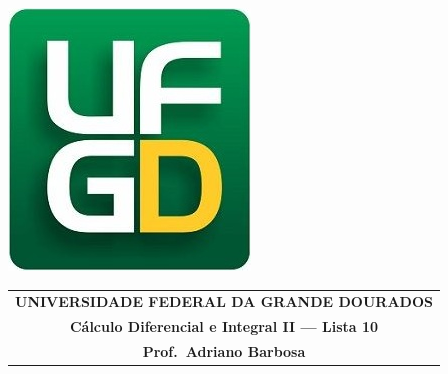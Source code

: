\documentclass[a4paper,5pt]{amsbook}
\begin{document}
\thispagestyle{empty}
\pagestyle{empty}
\begin{minipage}[h]{0.14\textwidth}
    \includegraphics[scale=0.24]{../../ufgd.png}
\end{minipage}
\begin{minipage}[h]{\textwidth}
    \begin{tabular}{c}
        {{\bf UNIVERSIDADE FEDERAL DA GRANDE DOURADOS}}\\
        {{\bf C\'{a}lculo Diferencial e Integral II --- Lista 10}}\\
        {{\bf Prof.\ Adriano Barbosa}}\\
    \end{tabular}
    \vspace{-0.45cm}
\end{minipage}

\end{document}
